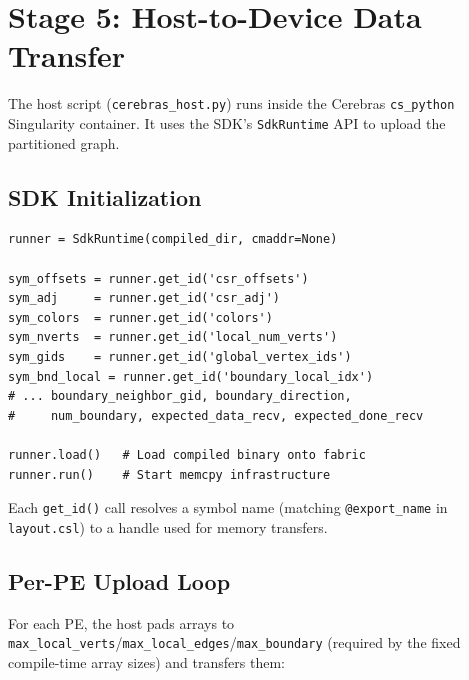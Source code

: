 \documentclass[11pt,letterpaper]{article}
\begin{document}
\section{Stage 5: Host-to-Device Data Transfer}
\label{sec:h2d}

The host script (\texttt{cerebras\_host.py}) runs inside the Cerebras \texttt{cs\_python} Singularity container. It uses the SDK's \texttt{SdkRuntime} API to upload the partitioned graph.

\subsection{SDK Initialization}

\begin{lstlisting}[language=PyHost, caption={SDK setup (from \texttt{cerebras\_host.py})}, label=lst:sdk]
runner = SdkRuntime(compiled_dir, cmaddr=None)

sym_offsets = runner.get_id('csr_offsets')
sym_adj     = runner.get_id('csr_adj')
sym_colors  = runner.get_id('colors')
sym_nverts  = runner.get_id('local_num_verts')
sym_gids    = runner.get_id('global_vertex_ids')
sym_bnd_local = runner.get_id('boundary_local_idx')
# ... boundary_neighbor_gid, boundary_direction,
#     num_boundary, expected_data_recv, expected_done_recv

runner.load()   # Load compiled binary onto fabric
runner.run()    # Start memcpy infrastructure
\end{lstlisting}

Each \texttt{get\_id()} call resolves a symbol name (matching \texttt{@export\_name} in \texttt{layout.csl}) to a handle used for memory transfers.

\subsection{Per-PE Upload Loop}

For each PE, the host pads arrays to \texttt{max\_local\_verts}/\texttt{max\_local\_edges}/\texttt{max\_boundary} (required by the fixed compile-time array sizes) and transfers them:
\end{document}
